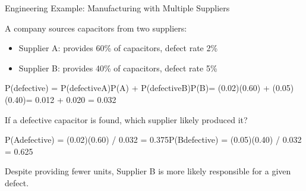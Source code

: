 \begin{PSbox}[unbreakable]{ex}{Engineering Example: Manufacturing with Multiple Suppliers}

A company sources capacitors from two suppliers:

\begin{itemize}
\tightlist
\item
  Supplier A: provides 60\% of capacitors, defect rate 2\%
\item
  Supplier B: provides 40\% of capacitors, defect rate 5\%
\end{itemize}

P(defective) = P(defective\textbar{}A)P(A) + P(defective\textbar{}B)P(B)\PSbr{}= (0.02)(0.60) + (0.05)(0.40)\PSbr{}= 0.012 + 0.020 = 0.032

If a defective capacitor is found, which supplier likely produced it?

P(A\textbar{}defective) = (0.02)(0.60) / 0.032 = 0.375\PSbr{}P(B\textbar{}defective) = (0.05)(0.40) / 0.032 = 0.625

Despite providing fewer units, Supplier B is more likely responsible for a given defect.

\end{PSbox}


